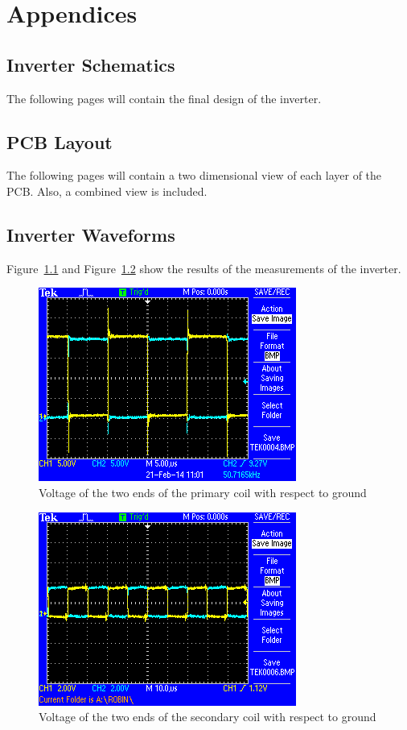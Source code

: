 \documentclass[11pt,titlepage]{report}
\begin{document}
\chapter{Appendices}
\section{Inverter Schematics}
\label{app:schematics}
The following pages will contain the final design of the inverter.
%

\section{PCB Layout}
\label{app:pcb_layout}
The following pages will contain a two dimensional view of each layer of the PCB. Also, a combined view is included.
% 

\section{Inverter Waveforms}
Figure~\ref{fig:app-osc-coil-primary} and Figure~\ref{fig:app-osc-coil-secondary} show the results of the measurements of the inverter. 
\label{app:waveforms}
\begin{figure}[H]
	\begin{center}
		\includegraphics[width=0.5\linewidth]{resource/osc-coil-primary.png}
	\end{center}
	\caption{Voltage of the two ends of the primary coil with respect to ground}
	\label{fig:app-osc-coil-primary}
\end{figure}
\begin{figure}[H]
	\begin{center}
		\includegraphics[width=0.5\linewidth]{resource/osc-coil-secondary.png}
	\end{center}
	\caption{Voltage of the two ends of the secondary coil with respect to ground}
	\label{fig:app-osc-coil-secondary}
\end{figure}
\end{document}
